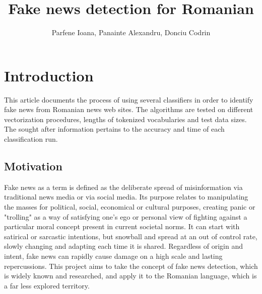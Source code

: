 \documentclass{article}
\author{Parfene Ioana, Panainte Alexandru, Donciu Codrin}
\title{\textbf{Fake news detection for Romanian}}
\begin{document}
	\maketitle
	
	\section{Introduction}
	\par This article documents the process of using several classifiers in order to identify fake news from Romanian news web sites. The algorithms are tested on different vectorization procedures, lengths of tokenized vocabularies and test data sizes. The sought after information pertains to the accuracy and time of each classification run.
	\subsection{Motivation}	
	Fake news as a term is defined as the deliberate spread of misinformation via traditional news media or via social media. Its purpose relates to manipulating the masses for political, social, economical or cultural purposes, creating panic or "trolling" as a way of satisfying one's ego or personal view of fighting against a particular moral concept present in current societal norms. It can start with satirical or sarcastic intentions, but snowball and spread at an out of control rate, slowly changing and adapting each time it is shared. Regardless of origin and intent, fake news can rapidly cause damage on a high scale and lasting repercussions. This project aims to take the concept of fake news detection, which is widely known and researched, and apply it to the Romanian language, which is a far less explored territory. 
	
\end{document}
